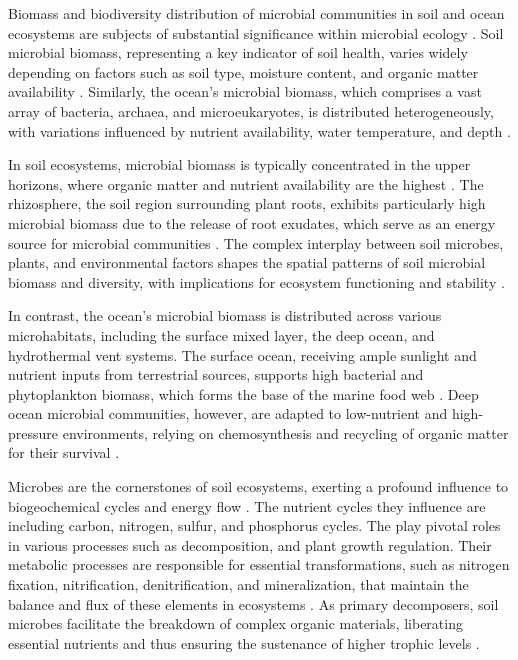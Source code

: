 Biomass and biodiversity distribution of microbial communities in soil and ocean
ecosystems are subjects of substantial significance within microbial ecology \parencite{bar2018biomass}.
Soil microbial biomass, representing a key indicator of soil health, varies
widely depending on factors such as soil type, moisture content, and organic
matter availability \parencite{Crowther2019}. Similarly, the ocean's
microbial biomass, which comprises a vast array of bacteria, archaea, and
microeukaryotes, is distributed heterogeneously, with variations influenced by
nutrient availability, water temperature, and depth \parencite{loucaDecouplingFunctionTaxonomy2016}.

In soil ecosystems, microbial biomass is typically concentrated in the upper
horizons, where organic matter and nutrient availability are the highest \parencite{Anthony2023}.
The rhizosphere, the soil region surrounding plant roots, exhibits particularly
high microbial biomass due to the release of root exudates, which serve as an
energy source for microbial communities \parencite{beugnon2022Abiotic}. The complex
interplay between soil microbes, plants, and environmental factors shapes the
spatial patterns of soil microbial biomass and diversity, with implications for
ecosystem functioning and stability \parencite{philippot2024the-interplay}.

In contrast, the ocean's microbial biomass is distributed across various
microhabitats, including the surface mixed layer, the deep ocean, and hydrothermal
vent systems. The surface ocean, receiving ample sunlight and nutrient inputs
from terrestrial sources, supports high bacterial and phytoplankton biomass,
which forms the base of the marine food web \parencite{Sunagawa2015}. Deep ocean
microbial communities, however, are adapted to low-nutrient and high-pressure
environments, relying on chemosynthesis and recycling of organic matter for their survival \parencite{christakis2018microbial}.

Microbes are the cornerstones of soil ecosystems, exerting a profound influence
to biogeochemical cycles and energy flow \parencite{graham2016Microbes}. The nutrient cycles they influence are
including carbon, nitrogen, sulfur, and phosphorus cycles.
The play pivotal roles in various processes such as decomposition,
and plant growth regulation.
Their metabolic processes are responsible for essential transformations, such as
nitrogen fixation, nitrification, denitrification, and mineralization, that
maintain the balance and flux of these elements in ecosystems \parencite{martiny2023Investigating}.
As primary decomposers, soil microbes facilitate the breakdown of complex
organic materials, liberating essential nutrients and thus ensuring the
sustenance of higher trophic levels \parencite{GRANDY201640}.

